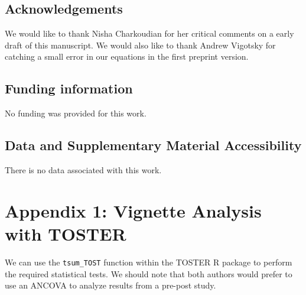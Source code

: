 \documentclass[]{cik}%
\newenvironment{Shaded}{\begin{snugshade}}{\end{snugshade}}
\newcommand{\AttributeTok}[1]{\textcolor[rgb]{0.77,0.63,0.00}{#1}}
\newcommand{\CommentTok}[1]{\textcolor[rgb]{0.56,0.35,0.01}{\textit{#1}}}
\newcommand{\DecValTok}[1]{\textcolor[rgb]{0.00,0.00,0.81}{#1}}
\newcommand{\FloatTok}[1]{\textcolor[rgb]{0.00,0.00,0.81}{#1}}
\newcommand{\FunctionTok}[1]{\textcolor[rgb]{0.00,0.00,0.00}{#1}}
\newcommand{\NormalTok}[1]{#1}
\newcommand{\OtherTok}[1]{\textcolor[rgb]{0.56,0.35,0.01}{#1}}
\newcommand{\SpecialCharTok}[1]{\textcolor[rgb]{0.00,0.00,0.00}{#1}}
\newcommand{\StringTok}[1]{\textcolor[rgb]{0.31,0.60,0.02}{#1}}
\begin{document}
\hypertarget{acknowledgements}{%
\subsection{Acknowledgements}\label{acknowledgements}}

We would like to thank Nisha Charkoudian for her critical comments on a
early draft of this manuscript. We would also like to thank Andrew
Vigotsky for catching a small error in our equations in the first
preprint version.

\hypertarget{funding-information}{%
\subsection{Funding information}\label{funding-information}}

No funding was provided for this work.

\hypertarget{data-and-supplementary-material-accessibility}{%
\subsection{Data and Supplementary Material
Accessibility}\label{data-and-supplementary-material-accessibility}}

There is no data associated with this work.

\newpage

\hypertarget{app1}{%
\section{Appendix 1: Vignette Analysis with TOSTER}\label{app1}}

We can use the \texttt{tsum\_TOST} function within the TOSTER R package
to perform the required statistical tests. We should note that both
authors would prefer to use an ANCOVA to analyze results from a pre-post
study.

\begin{Shaded}
\end{Shaded}
\end{document}

